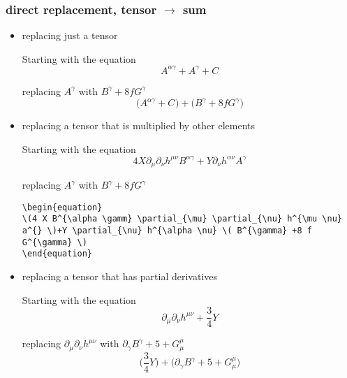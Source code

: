 \documentclass{article}
\def\){\Big)}
\def\({\Big(}
\begin{document}
\subsubsection{direct replacement, tensor $\rightarrow$ sum}

\begin{itemize}


%
\item{replacing just a tensor}

Starting with the equation
\begin{equation}
A^{\alpha \gamma} +  A^{\gamma}  + C^{} 
\end{equation}

replacing $ A^{\gamma} $ with $ B^{\gamma} + 8fG^{\gamma} $
\begin{equation}
\( A^{\alpha \gamma} + C^{} \)+\( B^{\gamma} +8 f G^{\gamma} \)
\end{equation}

%
\item{replacing a tensor that is multiplied by other elements}

{\color{red}
Starting with the equation
\begin{equation}
4 X \partial_{\mu} \partial_{\nu} h^{\mu \nu} B^{\alpha \gamma} +Y \partial_{\nu} h^{\alpha \nu} A^{\gamma}
\end{equation}

replacing $ A^{\gamma} $ with $ B^{\gamma} + 8fG^{\gamma} $
\begin{verbatim}
\begin{equation}
\(4 X B^{\alpha \gamm} \partial_{\mu} \partial_{\nu} h^{\mu \nu} a^{} \)+Y \partial_{\nu} h^{\alpha \nu} \( B^{\gamma} +8 f G^{\gamma} \)
\end{equation}
\end{verbatim}
}


%
\item{replacing a tensor that has partial derivatives}

Starting with the equation
\begin{equation}
\partial_{\mu} \partial_{\nu} h^{\mu \nu} + \frac{3}{4} Y
\end{equation}

replacing $ \partial_{\mu} \partial_{\nu} h^{\mu \nu} $ with $ \partial_{\gamma} B^{\gamma} + 5 + G^{\mu}_{\mu} $
\begin{equation}
\(\frac{3}{4} Y \)+\( \partial_{\gamma} B^{\gamma} +5 + G_{\mu}^{\mu} \)
\end{equation}


\end{itemize}
\end{document}
